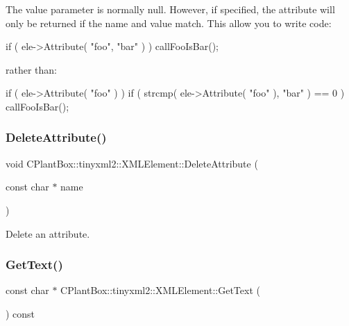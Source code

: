 The \textquotesingle{}value\textquotesingle{} parameter is normally null. However, if specified, the attribute will only be returned if the \textquotesingle{}name\textquotesingle{} and \textquotesingle{}value\textquotesingle{} match. This allow you to write code\+:

\begin{DoxyVerb}if ( ele->Attribute( "foo", "bar" ) ) callFooIsBar();
\end{DoxyVerb}


rather than\+: \begin{DoxyVerb}if ( ele->Attribute( "foo" ) ) {
    if ( strcmp( ele->Attribute( "foo" ), "bar" ) == 0 ) callFooIsBar();
}
\end{DoxyVerb}
 \mbox{\label{classCPlantBox_1_1tinyxml2_1_1XMLElement_a6970fd4e0934b3af40e83a16c137b300}} 
\subsubsection{\texorpdfstring{Delete\+Attribute()}{DeleteAttribute()}}
{\footnotesize\ttfamily void C\+Plant\+Box\+::tinyxml2\+::\+X\+M\+L\+Element\+::\+Delete\+Attribute (\begin{DoxyParamCaption}\item[{const char $\ast$}]{name }\end{DoxyParamCaption})}

Delete an attribute. \mbox{\label{classCPlantBox_1_1tinyxml2_1_1XMLElement_aa24b9d351b590707144522ec8a004270}} 
\subsubsection{\texorpdfstring{Get\+Text()}{GetText()}}
{\footnotesize\ttfamily const char $\ast$ C\+Plant\+Box\+::tinyxml2\+::\+X\+M\+L\+Element\+::\+Get\+Text (\begin{DoxyParamCaption}{ }\end{DoxyParamCaption}) const}

